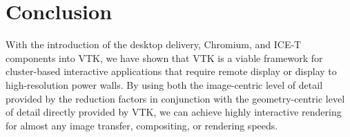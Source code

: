 \documentclass{acmsiggraph}
\newcommand{\sticky}[1]{}
\newcommand{\cidentifier}[1]{\texttt{#1}}
\begin{document}
  \section{Conclusion}
  \label{sec:conclusion}

  With the introduction of the desktop delivery, Chromium, and ICE-T
  components into VTK, we have shown that VTK is a viable framework for
  cluster-based interactive applications that require remote display or
  display to high-resolution power walls.  By using both the image-centric
  level of detail provided by the reduction factors in conjunction with the
  geometry-centric level of detail directly provided by VTK, we can achieve
  highly interactive rendering for almost any image transfer, compositing,
  or rendering speeds.  \sticky{Some empirical evidence, i.e. with LLNL
  data, would probably be good here.  But how?  You really need a video and
  see it in action.}


\end{document}
